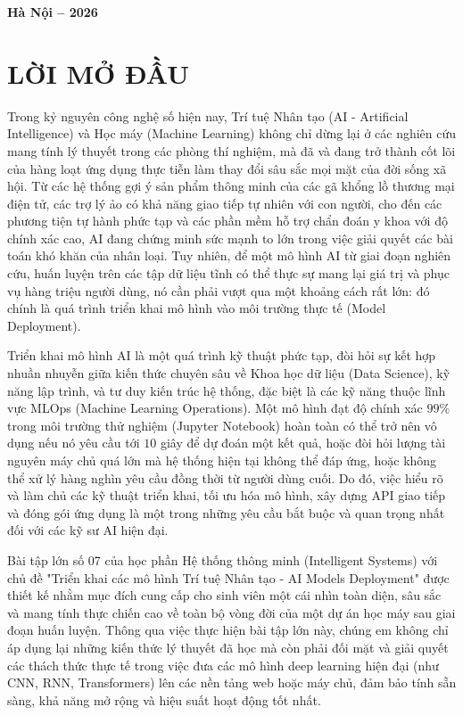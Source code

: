 \documentclass[12pt,a4paper]{article}
\begin{document}
\begin{titlepage}
    \vfill
    {\large \textbf{Hà Nội -- 2026}}
    \vspace*{0.3cm}
\end{titlepage}

\tableofcontents
\newpage

\section*{LỜI MỞ ĐẦU}

Trong kỷ nguyên công nghệ số hiện nay, Trí tuệ Nhân tạo (AI - Artificial Intelligence) và Học máy (Machine Learning) không chỉ dừng lại ở các nghiên cứu mang tính lý thuyết trong các phòng thí nghiệm, mà đã và đang trở thành cốt lõi của hàng loạt ứng dụng thực tiễn làm thay đổi sâu sắc mọi mặt của đời sống xã hội. Từ các hệ thống gợi ý sản phẩm thông minh của các gã khổng lồ thương mại điện tử, các trợ lý ảo có khả năng giao tiếp tự nhiên với con người, cho đến các phương tiện tự hành phức tạp và các phần mềm hỗ trợ chẩn đoán y khoa với độ chính xác cao, AI đang chứng minh sức mạnh to lớn trong việc giải quyết các bài toán khó khăn của nhân loại. Tuy nhiên, để một mô hình AI từ giai đoạn nghiên cứu, huấn luyện trên các tập dữ liệu tĩnh có thể thực sự mang lại giá trị và phục vụ hàng triệu người dùng, nó cần phải vượt qua một khoảng cách rất lớn: đó chính là quá trình triển khai mô hình vào môi trường thực tế (Model Deployment).

Triển khai mô hình AI là một quá trình kỹ thuật phức tạp, đòi hỏi sự kết hợp nhuần nhuyễn giữa kiến thức chuyên sâu về Khoa học dữ liệu (Data Science), kỹ năng lập trình, và tư duy kiến trúc hệ thống, đặc biệt là các kỹ năng thuộc lĩnh vực MLOps (Machine Learning Operations). Một mô hình đạt độ chính xác $99\%$ trong môi trường thử nghiệm (Jupyter Notebook) hoàn toàn có thể trở nên vô dụng nếu nó yêu cầu tới $10$ giây để dự đoán một kết quả, hoặc đòi hỏi lượng tài nguyên máy chủ quá lớn mà hệ thống hiện tại không thể đáp ứng, hoặc không thể xử lý hàng nghìn yêu cầu đồng thời từ người dùng cuối. Do đó, việc hiểu rõ và làm chủ các kỹ thuật triển khai, tối ưu hóa mô hình, xây dựng API giao tiếp và đóng gói ứng dụng là một trong những yêu cầu bắt buộc và quan trọng nhất đối với các kỹ sư AI hiện đại.

Bài tập lớn số 07 của học phần Hệ thống thông minh (Intelligent Systems) với chủ đề "Triển khai các mô hình Trí tuệ Nhân tạo - AI Models Deployment" được thiết kế nhằm mục đích cung cấp cho sinh viên một cái nhìn toàn diện, sâu sắc và mang tính thực chiến cao về toàn bộ vòng đời của một dự án học máy sau giai đoạn huấn luyện. Thông qua việc thực hiện bài tập lớn này, chúng em không chỉ áp dụng lại những kiến thức lý thuyết đã học mà còn phải đối mặt và giải quyết các thách thức thực tế trong việc đưa các mô hình deep learning hiện đại (như CNN, RNN, Transformers) lên các nền tảng web hoặc máy chủ, đảm bảo tính sẵn sàng, khả năng mở rộng và hiệu suất hoạt động tốt nhất.
\end{document}
